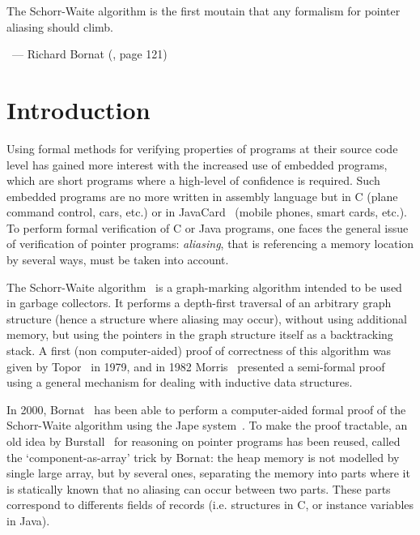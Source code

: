 


\hfill\begin{minipage}{0.6\textwidth}
\begin{slshape}
The Schorr-Waite algorithm is the first moutain that any formalism for
pointer aliasing should climb.
\end{slshape}

~\hfill --- Richard Bornat (\cite{bornat00mpc}, page 121)
\end{minipage}

\section{Introduction}

Using formal methods for verifying properties of programs at their
source code level has gained more interest with the increased use of
embedded programs, which are short programs where a high-level of
confidence is required. Such embedded programs are no more written in
assembly language but in C (plane command control, cars, etc.) or in
JavaCard~\cite{JavaCard} (mobile phones, smart cards, etc.).  To
perform formal verification of C or Java programs, one faces the
general issue of verification of pointer programs: \emph{aliasing},
that is referencing a memory location by several ways, must be taken
into account. 

The Schorr-Waite algorithm~\cite{schorr67cacm} is a graph-marking
algorithm intended to be used in garbage collectors. It performs a
depth-first traversal of an arbitrary graph structure (hence a
structure where aliasing may occur), without using additional memory,
but using the pointers in the graph structure itself as a backtracking
stack. A first (non computer-aided) proof of correctness of this
algorithm was given by Topor~\cite{topor79acta} in 1979, and in 1982
Morris~\cite{morris82} presented a semi-formal proof using a general
mechanism for dealing with inductive data structures.


In 2000, Bornat~\cite{bornat00mpc} has been able to perform a
computer-aided formal proof of the Schorr-Waite algorithm using the
Jape system~\cite{bornat99}. To make the proof tractable, an old idea by
Burstall~\cite{burstall72} for reasoning on pointer programs has been
reused, called the `component-as-array' trick by Bornat: the heap
memory is not modelled by single large array, but by several ones,
separating the memory into parts where it is statically known that no
aliasing can occur between two parts. These parts correspond to
differents fields of records (i.e. structures in C, or instance
variables in Java).

